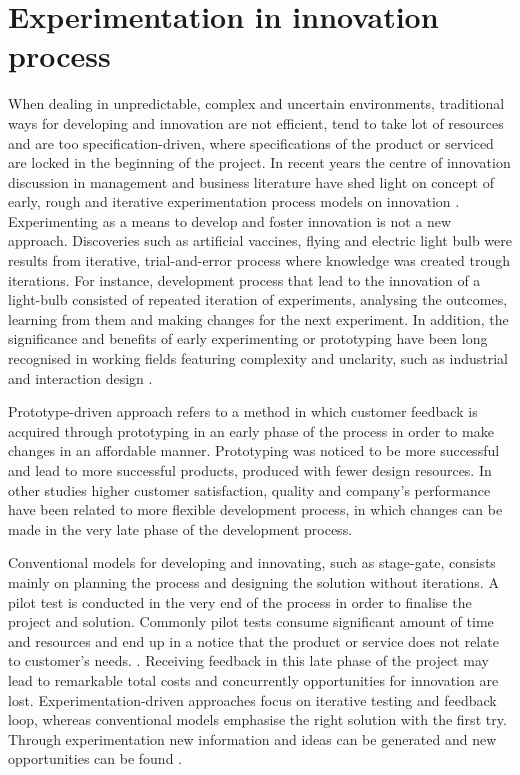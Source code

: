 \section{Experimentation in innovation process}
When dealing in unpredictable, complex and uncertain environments, traditional ways for developing and innovation are not efficient, tend to take lot of resources and are too specification-driven, where specifications of the product or serviced are locked in the beginning of the project. In recent years the centre of innovation discussion in management and business literature have shed light on concept of early, rough and iterative experimentation process models on innovation \citep{thomke1998managing,tuulenmaki2011art}. Experimenting as a means to develop and foster innovation is not a new approach. Discoveries such as artificial vaccines, flying and electric light bulb were results from iterative, trial-and-error process where knowledge was created trough iterations. \citep{thomke2003r} For instance, development process that lead to the innovation of a light-bulb consisted of repeated iteration of experiments, analysing the outcomes, learning from them and making changes for the next experiment. \citep{thomke2001enlightened} In addition, the significance and benefits of early experimenting or prototyping have been long recognised in working fields featuring complexity and unclarity, such as industrial and interaction design \citep{blomkvist2011conceptualising}. 

Prototype-driven approach refers to a method in which customer feedback is acquired through prototyping in an early phase of the process in order to make changes in an affordable manner. Prototyping was noticed to be more successful and lead to more successful products, produced with fewer design resources. In other studies higher customer satisfaction, quality and company's performance have been related to more flexible development process, in which changes can be made in the very late phase of the development process. \citep{thomke1998agile}

Conventional models for developing and innovating, such as stage-gate, consists mainly on planning the process and designing the solution without iterations. A pilot test is conducted in the very end of the process in order to finalise the project and solution. Commonly pilot tests consume significant amount of time and resources and end up in a notice that the product or service does not relate to customer's needs. \citep{schrage1993culture}. Receiving feedback in this late phase of the project may lead to remarkable total costs and concurrently opportunities for innovation are lost. Experimentation-driven approaches focus on iterative testing and feedback loop, whereas conventional models emphasise the right solution with the first try. \citep{thomke2003r} Through experimentation new information and ideas can be generated and new opportunities can be found \citep{tuulenmaki2011art, mcgrath2010business}. 

